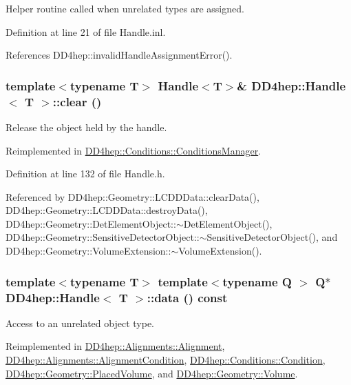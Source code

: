 Helper routine called when unrelated types are assigned. 

Definition at line 21 of file Handle.inl.

References DD4hep::invalidHandleAssignmentError().\hypertarget{class_d_d4hep_1_1_handle_ad50d0ea67a1c9a4e87d232f96ebe52f1}{
\subsubsection[{clear}]{\setlength{\rightskip}{0pt plus 5cm}template$<$typename T$>$ {\bf Handle}$<${\bf T}$>$\& {\bf DD4hep::Handle}$<$ {\bf T} $>$::clear ()}}
\label{class_d_d4hep_1_1_handle_ad50d0ea67a1c9a4e87d232f96ebe52f1}


Release the object held by the handle. 

Reimplemented in \hyperlink{class_d_d4hep_1_1_conditions_1_1_conditions_manager_af1a5f51d3f887ebee75eb32094d1ee3f}{DD4hep::Conditions::ConditionsManager}.

Definition at line 132 of file Handle.h.

Referenced by DD4hep::Geometry::LCDDData::clearData(), DD4hep::Geometry::LCDDData::destroyData(), DD4hep::Geometry::DetElementObject::$\sim$DetElementObject(), DD4hep::Geometry::SensitiveDetectorObject::$\sim$SensitiveDetectorObject(), and DD4hep::Geometry::VolumeExtension::$\sim$VolumeExtension().\hypertarget{class_d_d4hep_1_1_handle_a821fe41f46aa5ce97cfb04a6a60e5cd5}{
\subsubsection[{data}]{\setlength{\rightskip}{0pt plus 5cm}template$<$typename T$>$ template$<$typename Q $>$ Q$\ast$ {\bf DD4hep::Handle}$<$ {\bf T} $>$::data () const}}
\label{class_d_d4hep_1_1_handle_a821fe41f46aa5ce97cfb04a6a60e5cd5}


Access to an unrelated object type. 

Reimplemented in \hyperlink{class_d_d4hep_1_1_alignments_1_1_alignment_a4e3a6f62b476f5fac4a097ae55be8f62}{DD4hep::Alignments::Alignment}, \hyperlink{class_d_d4hep_1_1_alignments_1_1_alignment_condition_a3425870f9b961eef0be9c68cb3117614}{DD4hep::Alignments::AlignmentCondition}, \hyperlink{class_d_d4hep_1_1_conditions_1_1_condition_a1154252bf161472cd72411149a10702d}{DD4hep::Conditions::Condition}, \hyperlink{class_d_d4hep_1_1_geometry_1_1_placed_volume_ac13225b8f8408419cc0dd096f59cc934}{DD4hep::Geometry::PlacedVolume}, and \hyperlink{class_d_d4hep_1_1_geometry_1_1_volume_aca15c04f667b12b142a300070c9b99ca}{DD4hep::Geometry::Volume}.

